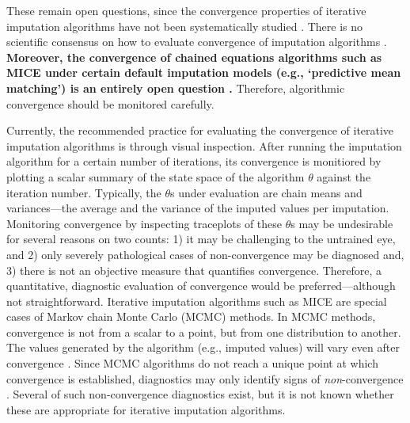 \documentclass[Royal,times,sageh]{sagej}
\begin{document}
These remain open questions, since the convergence properties of iterative imputation algorithms have not been systematically studied \citep{buur18}. There is no scientific consensus on how to evaluate convergence of imputation algorithms \citep{taka17}. \textbf{Moreover, the convergence of chained equations algorithms such as MICE under certain default imputation models (e.g., `predictive mean matching') is an entirely open question \citep{murr18}.} Therefore, algorithmic convergence should be monitored carefully.

Currently, the recommended practice for evaluating the convergence of iterative imputation algorithms is through visual inspection. After running the imputation algorithm for a certain number of iterations, its convergence is monitiored by plotting a scalar summary of the state space of the algorithm \(\theta\) against the iteration number. Typically, the \(\theta\)s under evaluation are chain means and variances---the average and the variance of the imputed values per imputation. Monitoring convergence by inspecting traceplots of these \(\theta\)s may be undesirable for several reasons on two counts: 1) it may be challenging to the untrained eye, and 2) only severely pathological cases of non-convergence may be diagnosed \citep[\(\S\) 6.5.2]{buur18} and, 3) there is not an objective measure that quantifies convergence. Therefore, a quantitative, diagnostic evaluation of convergence would be preferred---although not straightforward. Iterative imputation algorithms such as MICE are special cases of Markov chain Monte Carlo (MCMC) methods. In MCMC methods, convergence is not from a scalar to a point, but from one distribution to another. The values generated by the algorithm (e.g., imputed values) will vary even after convergence \citep{gelm13}. Since MCMC algorithms do not reach a unique point at which convergence is established, diagnostics may only identify signs of \emph{non}-convergence \citep{hoff09}. Several of such non-convergence diagnostics exist, but it is not known whether these are appropriate for iterative imputation algorithms.
\end{document}
